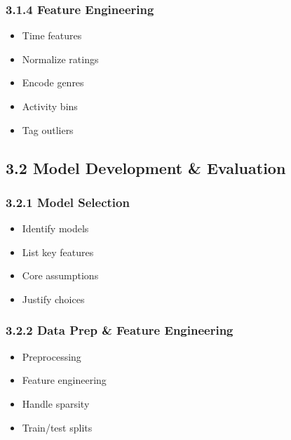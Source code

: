 \documentclass[
]{article}
\providecommand{\tightlist}{%
  \setlength{\itemsep}{0pt}\setlength{\parskip}{0pt}}
\begin{document}
\subsubsection{3.1.4 Feature Engineering}\label{feature-engineering}

\begin{itemize}
\tightlist
\item
  Time features\\
\item
  Normalize ratings\\
\item
  Encode genres\\
\item
  Activity bins\\
\item
  Tag outliers \newpage
\end{itemize}

\subsection{3.2 Model Development \&
Evaluation}\label{model-development-evaluation}

\newpage

\subsubsection{3.2.1 Model Selection}\label{model-selection}

\begin{itemize}
\tightlist
\item
  Identify models\\
\item
  List key features\\
\item
  Core assumptions\\
\item
  Justify choices \newpage
\end{itemize}

\subsubsection{3.2.2 Data Prep \& Feature
Engineering}\label{data-prep-feature-engineering}

\begin{itemize}
\tightlist
\item
  Preprocessing\\
\item
  Feature engineering\\
\item
  Handle sparsity\\
\item
  Train/test splits \newpage
\end{itemize}
\end{document}
